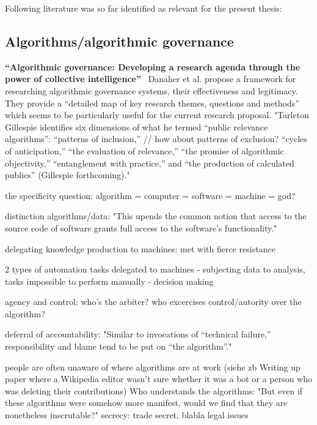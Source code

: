 \documentclass[pdftex,a4paper,11pt]{scrartcl}
\begin{document}
Following literature was so far identified as relevant for the present thesis:

\subsection{Algorithms/algorithmic governance}
\textbf{``Algorithmic governance: Developing a research agenda through the power of collective intelligence''}~\cite{DanaherEtAl2017}
\newline
\newline
Danaher et al. propose a framework for researching algorithmic governance systems, their effectiveness and legitimacy.
They provide a ``detailed map of key research themes, questions and methods'' which seems to be particularly useful for the current research proposal.
\newline
\newline
\cite{BarHooZie2013}
"Tarleton Gillespie identifies six dimensions of what he
termed “public relevance algorithms”:
“patterns of inclusion,” // how about patterns of exclusion?
“cycles of anticipation,”
“the evaluation of relevance,” 
“the promise of algorithmic objectivity,”
“entanglement with practice,”
and “the production of calculated publics” (Gillespie forthcoming)."

the specificity question:
algorithm = computer = software = machine = god?

distinction algorithms/data:
"This upends the common notion that access to the source code of
software grants full access to the software’s functionality."

delegating knowledge production to machines: met with fierce resistance

2 types of automation tasks delegated to machines
- subjecting data to analysis, tasks impossible to perform manually
- decision making

agency and control: who's the arbiter? who excercises control/autority over the
algorithm?

deferral of accountability:
"Similar to invocations of
“technical failure,” responsibility and blame tend to be put on “the
algorithm”."

people are often unaware of where algorithms are at work (siehe zb Writing up
paper where a Wikipedia editor wasn't sure whether it was a bot or a person who
was deleting their contributions)
Who understands the algorithms:
"But even if these algorithms
were somehow more manifest, would we find that they are nonetheless
inscrutable?"
secrecy: trade secret, blabla
legal issues
\end{document}
